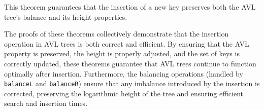 This theorem guarantees that the insertion of a new key preserves both the AVL tree’s balance and its height properties.

The proofs of these theorems collectively demonstrate that the insertion operation in AVL trees is both correct and efficient. By ensuring that the AVL property is preserved, the height is properly adjusted, and the set of keys is correctly updated, these theorems guarantee that AVL trees continue to function optimally after insertion. Furthermore, the balancing operations (handled by \texttt{balanceL} and \texttt{balanceR}) ensure that any imbalance introduced by the insertion is corrected, preserving the logarithmic height of the tree and ensuring efficient search and insertion times.